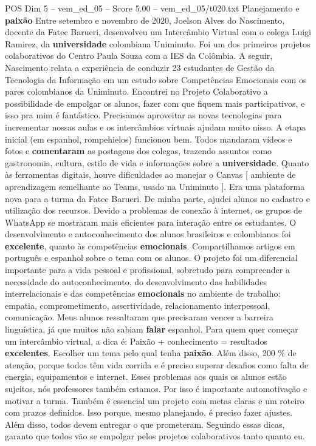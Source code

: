 \begin{textsample}{POS Dim 5 – vem\_ed\_05 – Score 5.00 – vem\_ed\_05/t020.txt}  \label{ex:f5_pos_070}
Planejamento e \textbf{paixão} Entre setembro e novembro de 2020, Joelson Alves do Nascimento, docente da Fatec Barueri, desenvolveu um Intercâmbio Virtual com o colega Luigi Ramirez, da \textbf{universidade} colombiana Uniminuto.
Foi um dos primeiros projetos colaborativos do Centro Paula Souza com a IES da Colômbia.
A seguir, Nascimento relata a experiência de conduzir 23 estudantes de Gestão da Tecnologia da Informação em um estudo sobre Competências Emocionais com os pares colombianos da Uniminuto.
Encontrei no Projeto Colaborativo a possibilidade de empolgar os alunos, fazer com que fiquem mais participativos, e isso pra mim é fantástico.
Precisamos aproveitar as novas tecnologias para incrementar nossas aulas e os intercâmbios virtuais ajudam muito nisso.
A etapa inicial (em espanhol, rompehielos) funcionou bem.
Todos mandaram vídeos e fotos e \textbf{comentaram} as postagens dos colegas, trazendo assuntos como gastronomia, cultura, estilo de vida e informações sobre a \textbf{universidade}.
Quanto às ferramentas digitais, houve dificuldades ao manejar o Canvas [ ambiente de aprendizagem semelhante ao Teams, usado na Uniminuto ].
Era uma plataforma nova para a turma da Fatec Barueri.
De minha parte, ajudei alunos no cadastro e utilização dos recursos.
Devido a problemas de conexão à internet, os grupos de WhatsApp se mostraram mais eficientes para interação entre os estudantes.
O desenvolvimento e autoconhecimento dos alunos brasileiros e colombianos foi \textbf{excelente}, quanto às competências \textbf{emocionais}.
Compartilhamos artigos em português e espanhol sobre o tema com os alunos.
O projeto foi um diferencial importante para a vida pessoal e profissional, sobretudo para compreender a necessidade do autoconhecimento, do desenvolvimento das habilidades interrelacionais e das competências \textbf{emocionais} no ambiente de trabalho: empatia, comprometimento, assertividade, relacionamento interpessoal, comunicação.
Meus alunos ressaltaram que precisaram vencer a barreira linguística, já que muitos não sabiam \textbf{falar} espanhol.
Para quem quer começar um intercâmbio virtual, a dica é: Paixão + conhecimento = resultados \textbf{excelentes}.
Escolher um tema pelo qual tenha \textbf{paixão}.
Além disso, 200 \% de atenção, porque todos têm vida corrida e é preciso superar desafios como falta de energia, equipamentos e internet.
Esses problemas aos quais os alunos estão sujeitos, nós professores também estamos.
Por isso é importante automotivação e motivar a turma.
Também é essencial um projeto com metas claras e um roteiro com prazos definidos.
Isso porque, mesmo planejando, é preciso fazer ajustes.
Além disso, todos devem entregar o que prometeram.
Seguindo essas dicas, garanto que todos vão se empolgar pelos projetos colaborativos tanto quanto eu.

\end{textsample}
